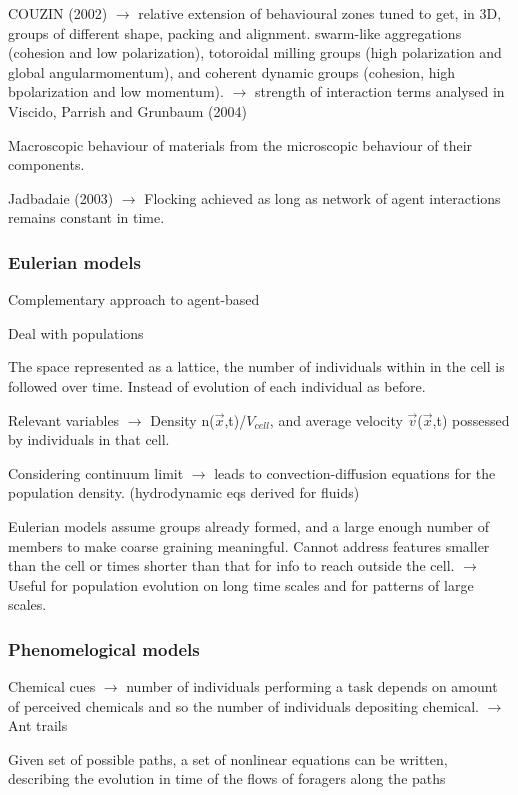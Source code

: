 \documentclass[10pt,twocolumn]{revtex4-2}    %
\begin{document}
COUZIN (2002) $\rightarrow$ relative extension of behavioural zones tuned to get, in 3D, groups of different shape, packing and alignment. {swarm-like aggregations (cohesion and low polarization), totoroidal milling groups (high polarization and global angularmomentum), and coherent dynamic groups (cohesion, high bpolarization and low momentum).} $\rightarrow$ strength of interaction terms analysed in Viscido, Parrish and Grunbaum (2004)

Macroscopic behaviour of materials from the microscopic behaviour of their components. 

Jadbadaie (2003) $\rightarrow$ Flocking achieved as long as network of agent interactions remains constant in time.

\subsubsection{Eulerian models}

Complementary approach to agent-based 

Deal with populations

The space represented as a lattice, the number of individuals within in the cell is followed over time. Instead of evolution of each individual as before.

Relevant variables $\rightarrow$ Density {n($\overrightarrow{x}$,t)/$V_{cell}$}, and average velocity $\overrightarrow{v}$($\overrightarrow{x}$,t) possessed by individuals in that cell.

Considering continuum limit $\rightarrow$ leads to convection-diffusion equations for the population density. (hydrodynamic eqs derived for fluids)

Eulerian models assume groups already formed, and a large enough number of members to make coarse graining meaningful. Cannot address features smaller than the cell or times shorter than that for info to reach outside the cell. $\rightarrow$ Useful for population evolution on long time scales and for patterns of large scales.


\subsubsection{Phenomelogical models}

Chemical cues $\rightarrow$ number of individuals performing a task depends on amount of perceived chemicals and so the number of individuals depositing chemical. $\rightarrow$ Ant trails

Given set of possible paths, a set of nonlinear equations can be written, describing the evolution in time of the flows of foragers along the paths
\end{document}
